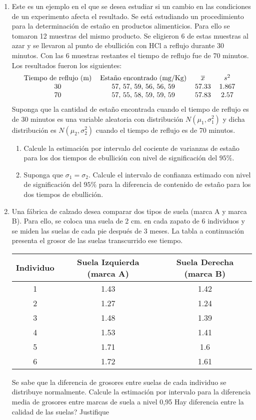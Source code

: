 \documentclass[11pt,a4paper,twoside]{article}%
\begin{document}
\begin{enumerate}
\item Este es un ejemplo en el que se desea estudiar si un cambio en las condiciones de un experimento afecta el resultado. Se est\'{a} estudiando un procedimiento para la determinaci\'{o}n de esta\~{n}o en productos alimenticios. Para ello se tomaron 12 muestras del mismo producto. Se
eligieron 6 de estas muestras al azar y se llevaron al punto de ebullici\'{o}n
con HCl a reflujo durante 30 minutos. Con las 6 muestras restantes el tiempo
de reflujo fue de 70 minutos. Los resultados fueron los siguientes:%
\[%
\begin{tabular}
[c]{cccc}%
Tiempo de reflujo (m)\qquad & Esta\~{n}o encontrado (mg/Kg) & $\overline{x}$ &
$s^{2}$\\
30 & 57, 57, 59, 56, 56, 59 & 57.33 & 1.867\\
70 & 57, 55, 58, 59, 59, 59 & 57.83 & 2.57
\end{tabular}
\ \
\]
Suponga que la cantidad de esta\~{n}o encontrada cuando el tiempo de reflujo
es de 30 minutos es una variable aleatoria con distribuci\'{o}n $N(\mu
_{1},\sigma_1^{2})$ y dicha distribuci\'{o}n es $N(\mu_{2},\sigma_2^{2})$
cuando el tiempo de reflujo es de 70 minutos. 
\begin{enumerate}
\item Calcule la estimaci\'on por intervalo del cociente de varianzas de esta\~{n}o para los dos tiempos de ebullici\'{o}n con nivel de significaci\'on del $95 \%$.
\item Suponga que $\sigma_1=\sigma_2$. Calcule el intervalo de confianza estimado con nivel de significaci\'on del $95 \%$ para la diferencia de contenido de esta\~{n}o para los dos tiempos de ebullici\'{o}n.
\end{enumerate}

\item Una f\'abrica de calzado desea comparar dos tipos de suela (marca A y marca B). Para ello, se coloca una  suela de 2 cm. en  cada zapato de 6 individuos y se miden las suelas de cada pie despu\'es de 3 meses. La tabla a continuaci\'on presenta el grosor de las suelas transcurrido ese tiempo.

\vspace{0.2cm}
	\begin{tabular}{|c|c|c|}\hline
		Individuo & Suela Izquierda (marca A)  &Suela Derecha (marca B)\\\hline\hline
1	&	1.43	&	1.42	\\
2	&	1.27	&	1.24	\\
3	&	1.48	&	1.39	\\
4	&	1.53	&	1.41	\\
5	&	1.71	&	1.6	\\
6	&	1.72	&	1.61	\\
\hline
\end{tabular}

Se sabe que la diferencia de grosores entre suelas de cada individuo se distribuye normalmente. Calcule la estimaci\'on por intervalo para la diferencia media de grosores entre marcas de suela a nivel 0,95 \textquestiondown Hay diferencia entre la calidad de las suelas? Justifique


\end{enumerate}
\end{document}
